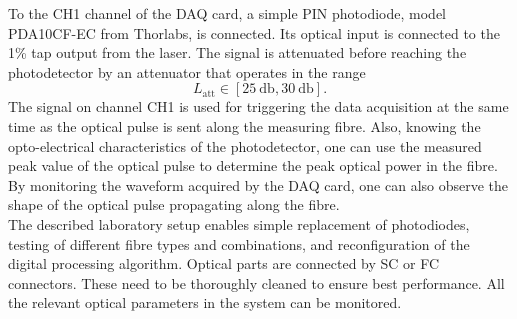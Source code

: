 \documentclass{standalone}
\begin{document}
To the CH1 channel of the DAQ card, a simple PIN photodiode, model PDA10CF-EC from Thorlabs, is connected. Its optical input is connected to the 1\% tap output from the laser. The signal is attenuated before reaching the photodetector by an attenuator that operates in the range
\begin{equation}
L_\textrm{att} \in [\SI{25}{\decibel}, \SI{30}{\decibel}] \textrm{.}
\end{equation}
The signal on channel CH1 is used for triggering the data acquisition at the same time as the optical pulse is sent along the measuring fibre. Also, knowing the opto-electrical characteristics of the photodetector, one can use the measured peak value of the optical pulse to determine the peak optical power in the fibre. By monitoring the waveform acquired by the DAQ card, one can also observe the shape of the optical pulse propagating along the fibre. \\

The described laboratory setup enables simple replacement of photodiodes, testing of different fibre types and combinations, and reconfiguration of the digital processing algorithm. Optical parts are connected by SC or FC connectors. These need to be thoroughly cleaned to ensure best performance. All the relevant optical parameters in the system can be monitored. 


\setcounter{stranica}{\thepage}
\addtocounter{stranica}{1}
\end{document}
